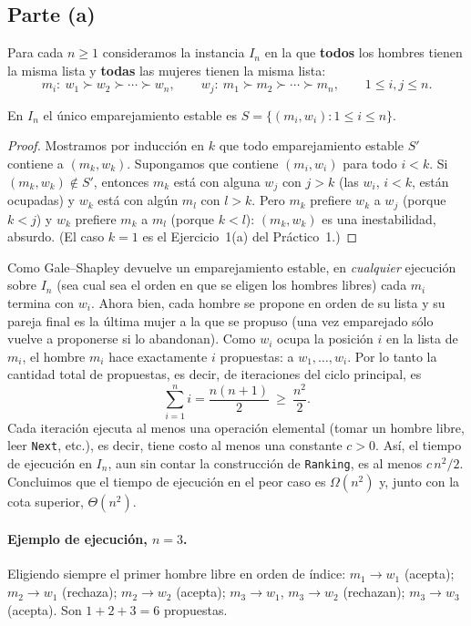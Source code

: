\subsection*{Parte (a)}
Para cada $n\ge1$ consideramos la instancia $I_n$ en la que \textbf{todos} los hombres tienen
la misma lista y \textbf{todas} las mujeres tienen la misma lista:
\[
m_i:\ w_1\succ w_2\succ\cdots\succ w_n,\qquad
w_j:\ m_1\succ m_2\succ\cdots\succ m_n,\qquad 1\le i,j\le n .
\]

\begin{lema}
En $I_n$ el único emparejamiento estable es $S=\{(m_i,w_i):1\le i\le n\}$.
\end{lema}
\begin{proof}
Mostramos por inducción en $k$ que todo emparejamiento estable $S'$ contiene a $(m_k,w_k)$.
Supongamos que contiene $(m_i,w_i)$ para todo $i<k$. Si $(m_k,w_k)\notin S'$, entonces $m_k$
está con alguna $w_j$ con $j>k$ (las $w_i$, $i<k$, están ocupadas) y $w_k$ está con algún
$m_l$ con $l>k$. Pero $m_k$ prefiere $w_k$ a $w_j$ (porque $k<j$) y $w_k$ prefiere $m_k$ a
$m_l$ (porque $k<l$): $(m_k,w_k)$ es una inestabilidad, absurdo. (El caso $k=1$ es
el Ejercicio~1(a) del Práctico~1.)
\end{proof}

Como Gale--Shapley devuelve un emparejamiento estable, en \emph{cualquier} ejecución sobre
$I_n$ (sea cual sea el orden en que se eligen los hombres libres) cada $m_i$ termina con $w_i$.
Ahora bien, cada hombre se propone en orden de su lista y su pareja final es la última mujer a la
que se propuso (una vez emparejado sólo vuelve a proponerse si lo abandonan). Como $w_i$ ocupa
la posición $i$ en la lista de $m_i$, el hombre $m_i$ hace exactamente $i$ propuestas:
a $w_1,\dots,w_i$. Por lo tanto la cantidad total de propuestas, es decir, de iteraciones del
ciclo principal, es
\[
\sum_{i=1}^{n} i=\frac{n(n+1)}{2}\ \ge\ \frac{n^2}{2}.
\]
Cada iteración ejecuta al menos una operación elemental (tomar un hombre libre, leer
\texttt{Next}, etc.), es decir, tiene costo al menos una constante $c>0$. Así, el tiempo de
ejecución en $I_n$, aun sin contar la construcción de \texttt{Ranking}, es al menos
$c\,n^2/2$. Concluimos que el tiempo de ejecución en el peor caso es $\Omega(n^2)$ y, junto con
la cota superior, $\Theta(n^2)$.

\paragraph{Ejemplo de ejecución, $n=3$.} Eligiendo siempre el primer hombre libre en orden de
índice: $m_1\to w_1$ (acepta); $m_2\to w_1$ (rechaza); $m_2\to w_2$ (acepta); $m_3\to w_1$,
$m_3\to w_2$ (rechazan); $m_3\to w_3$ (acepta). Son $1+2+3=6$ propuestas.

